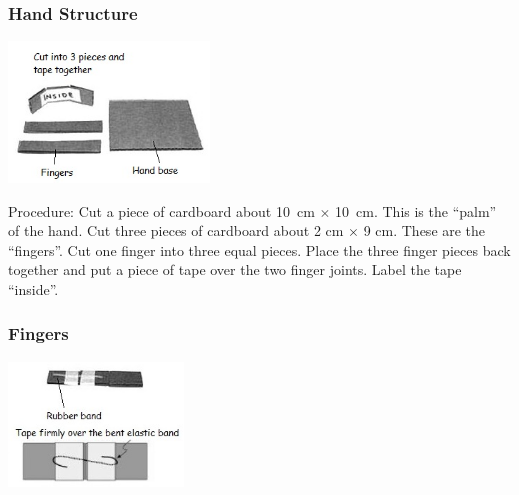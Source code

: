 \begin{multicols}{2}
\subsubsection{Hand Structure}

\begin{center}
\includegraphics[width=0.4\textwidth]{./img/robotic-hand-1.jpg}
\end{center}

\begin{description*}
\item[Procedure:]{Cut a piece of cardboard about 10~cm $\times$ 10~cm. This is the ``palm'' of the hand. Cut three pieces of cardboard about 2 cm $\times$ 9 cm. These are the ``fingers''. Cut one finger into three equal pieces. Place the three finger pieces back together and put a piece of tape over the two
finger joints. Label the tape ``inside''.}
\end{description*}

\subsubsection{Fingers}

\begin{center}
\includegraphics[width=0.35\textwidth]{./img/robotic-hand-finger.jpg}
\end{center}


\end{multicols}
